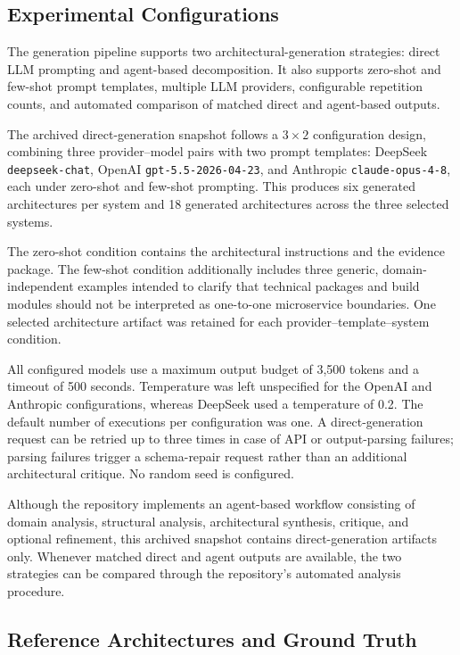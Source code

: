 \documentclass[acmsmall,screen,anonymous,review]{acmart}
\begin{document}
\subsection{Experimental Configurations}

The generation pipeline supports two architectural-generation strategies: direct LLM prompting and agent-based decomposition. It also supports zero-shot and few-shot prompt templates, multiple LLM providers, configurable repetition counts, and automated comparison of matched direct and agent-based outputs.

The archived direct-generation snapshot follows a $3 \times 2$ configuration design, combining three provider--model pairs with two prompt templates: DeepSeek \texttt{deepseek-chat}, OpenAI \texttt{gpt-5.5-2026-04-23}, and Anthropic \texttt{claude-opus-4-8}, each under zero-shot and few-shot prompting. This produces six generated architectures per system and 18 generated architectures across the three selected systems.

The zero-shot condition contains the architectural instructions and the evidence package. The few-shot condition additionally includes three generic, domain-independent examples intended to clarify that technical packages and build modules should not be interpreted as one-to-one microservice boundaries. One selected architecture artifact was retained for each provider--template--system condition.

All configured models use a maximum output budget of 3,500 tokens and a timeout of 500 seconds. Temperature was left unspecified for the OpenAI and Anthropic configurations, whereas DeepSeek used a temperature of 0.2. The default number of executions per configuration was one. A direct-generation request can be retried up to three times in case of API or output-parsing failures; parsing failures trigger a schema-repair request rather than an additional architectural critique. No random seed is configured.

Although the repository implements an agent-based workflow consisting of domain analysis, structural analysis, architectural synthesis, critique, and optional refinement, this archived snapshot contains direct-generation artifacts only. Whenever matched direct and agent outputs are available, the two strategies can be compared through the repository's automated analysis procedure.

\subsection{Reference Architectures and Ground Truth}
\end{document}

